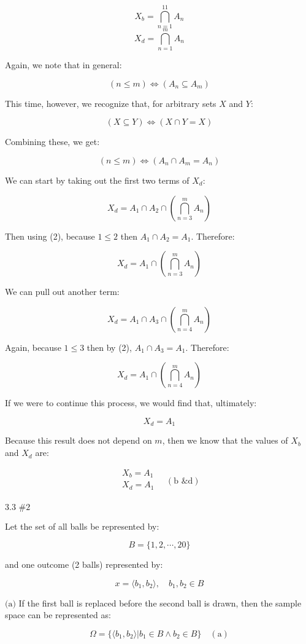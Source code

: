 \documentclass{article}
\newcommand{\problem}[2]{$\boxed{\text{#1 \##2}}$}
\newcommand{\subproblem}[1]{$\boxed{\text{(#1)}}$}
\newcommand{\subsolution}[2]{\boxed{#2\quad(\text{#1})}}
\begin{document}
\begin{multicols*}{2}
\[
X_b=\bigcap\limits_{n=1}^{11} A_n
\] \[
X_d=\bigcap\limits_{n=1}^m A_n
\]

Again, we note that in general:

\[
(n\le m)\Leftrightarrow(A_n\subseteq A_m)
\]

This time, however, we recognize that, for arbitrary sets $X$ and $Y$:

\[
(X\subseteq Y)\Leftrightarrow(X\cap Y=X)
\]

Combining these, we get:

\[\tag{2}
(n\le m)\Leftrightarrow(A_n\cap A_m=A_n)
\]

We can start by taking out the first two terms of $X_d$:

\[
X_d=A_1\cap A_2\cap\left(\bigcap\limits_{n=3}^m A_n\right)
\]

Then using (2), because $1\le2$ then $A_1\cap{}A_2=A_1$. Therefore:

\[
X_d=A_1\cap\left(\bigcap\limits_{n=3}^m A_n\right)
\]

We can pull out another term:

\[
X_d=A_1\cap A_3\cap\left(\bigcap\limits_{n=4}^m A_n\right)
\]

Again, because $1\le3$ then by (2), $A_1\cap{}A_3=A_1$. Therefore:

\[
X_d=A_1\cap\left(\bigcap\limits_{n=4}^m A_n\right)
\]

If we were to continue this process, we would find that, ultimately:

\[
X_d=A_1
\]

Because this result does not depend on $m$, then we know that the
values of $X_b$ and $X_d$ are:

\[
\subsolution{b \& d}{\begin{array}{l}
X_b=A_1 \\
X_d=A_1 \\
\end{array}}
\]

%
\problem{3.3}{2}

Let the set of all balls be represented by:

\[
B=\{1,2,\cdots,20\}
\]

and one outcome (2 balls) represented by:

\[
x=\langle b_1, b_2\rangle,\quad b_1,b_2\in B
\]

%
\subproblem{a} If the first ball is replaced before the second ball is
drawn, then the sample space can be represented as:

\[
\subsolution{a}{\Omega = \{\langle b_1,b_2\rangle|b_1\in B\wedge b_2\in B\}}
\]


\end{multicols*}
\end{document}
